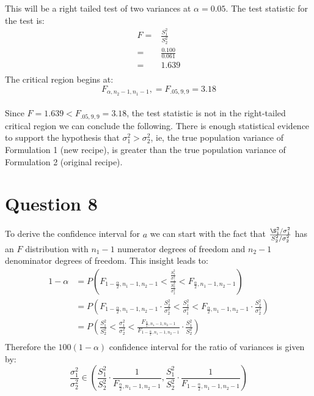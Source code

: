 \documentclass{article}
\begin{document}
This will be a right tailed test of two variances at $\alpha = 0.05$.
The test statistic for the test is:
\begin{align*}
  F = & \frac{S_1^2}{S_2^2} \\
    = & \frac{0.100}{0.061} \\
    = & 1.639 \\
\end{align*}
The critical region begins at:
\begin{equation*}
F_{\alpha , n_2-1, n_1-1},  = F_{.05 , 9, 9} = 3.18
\end{equation*}\\

Since $ F = 1.639 <  F_{.05 , 9, 9} = 3.18$, the test statistic is not in the right-tailed critical region
we can conclude the following.
There is enough statistical evidence to support the hypothesis that $\sigma_1^2 > \sigma_2^2$, ie,
the true
population variance of Formulation 1 (new recipe),
is greater than the true population variance of Formulation 2 (original recipe).

\clearpage
\section*{Question 8}
To derive the confidence interval for $a$ we can start with the fact that
$\frac{\S_1^2 / \sigma_1^2}{S_2^2 / \sigma_2^2}$
has an $F$ distribution with $n_1 - 1$ numerator
degrees of freedom and $n_2 - 1$ denominator degrees of freedom. This insight leads to:
\begin{align*}
1 - \alpha  & = P\left( F_{1 - \frac{\alpha}{2}, n_1 - 1, n_2 - 1} < \frac{\frac{S_1^2}{\sigma_1^2}}{\frac{S_2^2}{\sigma_2^2}} < F_{\frac{\alpha}{2}, n_1 - 1, n_2 - 1} \right) \\
            & = P\left( F_{1 - \frac{\alpha}{2}, n_1 - 1, n_2 - 1} \cdot \frac{S_2^2}{\sigma_2^2} < \frac{S_1^2}{\sigma_1^2} < F_{\frac{\alpha}{2}, n_1 - 1, n_2 - 1} \cdot \frac{S_2^2}{\sigma_2^2} \right) \\
            & = P\left( \frac{S_1^2}{S_2^2} < \frac{\sigma_1^2}{\sigma_2^2} < \frac{F_{\frac{\alpha}{2}, n_1 - 1, n_2 - 1}}{F_{1 - \frac{\alpha}{2}, n_1 - 1, n_2 - 1}} \cdot \frac{S_1^2}{S_2^2} \right) \\
\end{align*}
Therefore the $100(1-\alpha)$ confidence interval for the ratio of variances is given by:
\begin{equation*}
  \frac{\sigma_1^2}{\sigma_2^2} \in \left( \frac{S_1^2}{S_2^2} \cdot \frac{1}{F_{\frac{\alpha}{2}, n_1 - 1, n_2 - 1}}, \frac{S_1^2}{S_2^2} \cdot \frac{1}{F_{1 - \frac{\alpha}{2}, n_1 - 1, n_2 - 1}} \right)
  \end{equation*}\\
\end{document}
